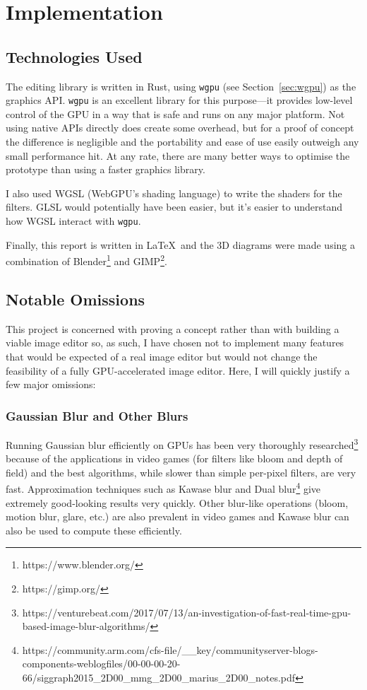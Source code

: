 \documentclass[12pt]{article}
\begin{document}
\pagebreak

\section{Implementation}

\subsection{Technologies Used}

The editing library is written in Rust, using \verb|wgpu| (see Section~\ref{sec:wgpu}) as the
graphics API\@.  \verb|wgpu| is an excellent library for this purpose---it provides low-level
control of the GPU in a way that is safe and runs on any major platform.  Not using native APIs
directly does create some overhead, but for a proof of concept the difference is negligible and the
portability and ease of use easily outweigh any small performance hit.  At any rate, there are many
better ways to optimise the prototype than using a faster graphics library.

I also used WGSL (WebGPU's shading language) to write the shaders for the filters.  GLSL would
potentially have been easier, but it's easier to understand how WGSL interact with \verb|wgpu|.

Finally, this report is written in \LaTeX\ and the 3D diagrams were made using a combination of
Blender\footnote{https://www.blender.org/} and GIMP\footnote{https://gimp.org/}.

\subsection{Notable Omissions}

This project is concerned with proving a concept rather than with building a viable image editor so, as
such, I have chosen not to implement many features that would be expected of a real image editor but
would not change the feasibility of a fully GPU-accelerated image editor.  Here, I will quickly
justify a few major omissions:

\subsubsection{Gaussian Blur and Other Blurs}

Running Gaussian blur efficiently on GPUs has been very thoroughly
researched\footnote{https://venturebeat.com/2017/07/13/an-investigation-of-fast-real-time-gpu-based-image-blur-algorithms/}
because of the applications in video games (for filters like bloom and depth of field) and the best
algorithms, while slower than simple per-pixel filters, are very fast.  Approximation techniques
such as Kawase blur and Dual
blur\footnote{https://community.arm.com/cfs-file/\_\_key/communityserver-blogs-components-weblogfiles/00-00-00-20-66/siggraph2015\_2D00\_mmg\_2D00\_marius\_2D00\_notes.pdf}
give extremely good-looking results very quickly.  Other blur-like operations (bloom, motion blur,
glare, etc.) are also prevalent in video games and Kawase blur can also be used to compute these
efficiently.
\end{document}
